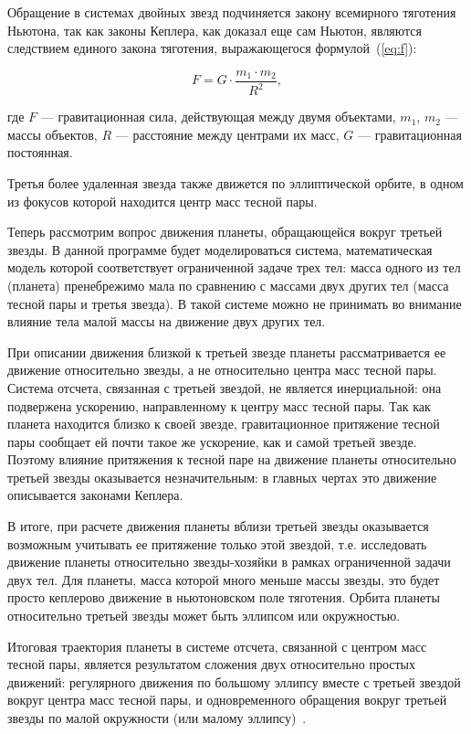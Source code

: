  Обращение в системах двойных звезд подчиняется закону всемирного тяготения Ньютона, так как законы Кеплера, как доказал еще сам Ньютон, являются следствием единого закона тяготения, выражающегося формулой~(\ref{eq:f}):

 \begin{equation}\label{eq:f}
	F = G \cdot \frac{m_{1} \cdot m_{2}}{R^2},
\end{equation} 

\noindent где $F$ --- гравитационная сила, действующая между двумя объектами,
$m_{1}$, $m_{2}$ --- массы объектов, $R$ --- расстояние между центрами их масс,
$G$ --- гравитационная постоянная.

Третья более удаленная звезда также движется по эллиптической орбите, в одном из фокусов которой находится центр масс тесной пары.

Теперь рассмотрим вопрос движения планеты, обращающейся вокруг третьей звезды. В данной программе будет моделироваться система, математическая модель которой соответствует ограниченной задаче трех тел: масса одного из тел (планета) пренебрежимо мала по сравнению с массами двух других тел (масса тесной пары и третья звезда). В такой системе можно не принимать во внимание влияние тела малой массы на движение двух других тел.

При описании движения близкой к третьей звезде планеты рассматривается ее движение относительно звезды, а не относительно центра масс тесной пары. Система отсчета, связанная с третьей звездой, не является инерциальной: она подвержена ускорению, направленному к центру масс тесной пары. Так как планета находится близко к своей звезде, гравитационное притяжение тесной пары сообщает ей почти такое же ускорение, как и самой третьей звезде. Поэтому влияние притяжения к тесной паре на движение планеты относительно третьей звезды оказывается незначительным: в главных чертах это движение описывается законами Кеплера. 

В итоге, при расчете движения планеты вблизи третьей звезды оказывается возможным учитывать ее притяжение только этой звездой, т.е. исследовать движение планеты относительно звезды-хозяйки в рамках ограниченной задачи двух тел. Для планеты, масса которой много меньше массы звезды, это будет просто кеплерово движение в ньютоновском поле тяготения. Орбита планеты относительно третьей звезды может быть эллипсом или окружностью.

Итоговая траектория планеты в системе отсчета, связанной с центром масс тесной пары, является результатом сложения двух относительно простых движений: регулярного движения по большому эллипсу вместе с третьей звездой вокруг центра масс тесной пары, и одновременного обращения вокруг третьей звезды по малой окружности (или малому эллипсу)~\cite{moroz}.


